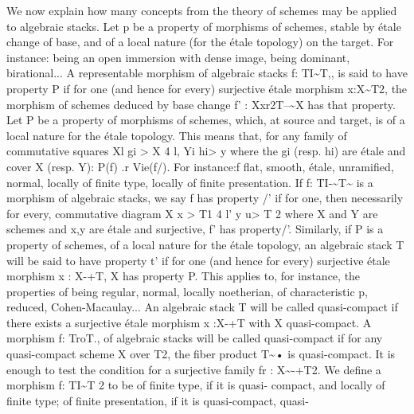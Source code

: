 \documentclass[11pt]{article}
\theoremstyle{plain}
\theoremstyle{definition}
\theoremstyle{remark}
\begin{document}
We now explain how many concepts from the theory of schemes may be applied to algebraic stacks. Let p be a property of morphisms of schemes, stable by étale change of base, and of a local nature (for the étale topology) on the target. For instance: being an open immersion with dense image, being dominant, birational... A representable morphism of algebraic stacks f: TI\textasciitilde{}T,, is said to have property P if for one (and hence for every) surjective étale morphism x:X\textasciitilde{}T2, the morphism of schemes deduced by base change f' : Xxr2T--\textasciitilde{}X has that property. Let P be a property of morphisms of schemes, which, at source and target, is of a local nature for the étale topology. This means that, for any family of commutative squares Xl gi > X 4 l, Yi hi> y where the gi (resp. hi) are étale and cover X (resp. Y): P(f) .r Vie(f/). For instance:f flat, smooth, étale, unramified, normal, locally of finite type, locally of finite presentation. If f: TI-\textasciitilde{}T\textasciitilde{} is a morphism of algebraic stacks, we say f has property /' if for one, then necessarily for every, commutative diagram X x > T1 4 l' y u> T 2 where X and Y are schemes and x,y are étale and surjective, f' has property/'. Similarly, if P is a property of schemes, of a local nature for the étale topology, an algebraic stack T will be said to have property t' if for one (and hence for every) surjective étale morphism x : X-+T, X has property P. This applies to, for instance, the properties of being regular, normal, locally noetherian, of characteristic p, reduced, Cohen-Macaulay... An algebraic stack T will be called quasi-compact if there exists a surjective étale morphism x :X-+T with X quasi-compact. A morphism f: TroT., of algebraic stacks will be called quasi-compact if for any quasi-compact scheme X over T2, the fiber product T\textasciitilde{}• is quasi-compact. It is enough to test the condition for a surjective family fr : X\textasciitilde{}-+T2. We define a morphism f: TI\textasciitilde{}T 2 to be of finite type, if it is quasi- compact, and locally of finite type; of finite presentation, if it is quasi-compact, quasi-
\end{document}
